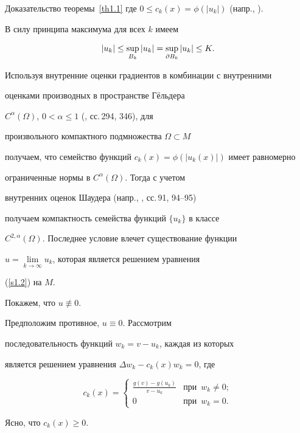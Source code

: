 \begin{pf*}{Доказательство теоремы~\ref{th1.1}}
где $0\leq c_k(x)=\phi(|u_k|)$ (напр., \cite{Lan2}).





В силу принципа максимума для всех $k$ имеем


$$


|u_k|\leq\sup_{B_k}|u_k|=\sup_{\d{B_k}}|u_k|\leq K.


$$


Используя внутренние оценки градиентов в комбинации с внутренними


оценками производных в пространстве Г\"ельдера


$C^\alpha(\Omega)$, $0<\alpha\leq1$ (\cite{Gi-T}, сс.\,294, 346), для


произвольного компактного подмножества $\Omega\subset M$ 


получаем, что семейство функций $c_k(x)=\phi(|u_k(x)|)$ имеет равномерно 


ограниченные нормы в $C^\alpha(\Omega)$. Тогда с учетом


внутренних оценок Шаудера (напр., \cite{Gi-T}, сс.\,91, 94--95)


получаем компактность семейства функций $\{u_k\}$ в классе 


$C^{2,\alpha}(\Omega)$. Последнее условие влечет существование функции 


$u=\lim\limits_{k\to\infty}u_k$, которая является решением уравнения


(\ref{s1.2}) на $M$.





Покажем, что $u\not\equiv 0$.


Предположим противное, $u\equiv 0$. Рассмотрим


последовательность функций $w_k=v-u_k$, каждая из которых


является решением уравнения $\Delta w_k-c_k(x)w_k=0$, где 


$$


c_k(x)=\begin{cases}


\frac{g(v)-g(u_k)}{v-u_k}& \text{при}\ \; w_k\ne0;\\


0& \text{при}\ \; w_k=0.


\end{cases}


$$


Ясно, что $c_k(x)\geq0$.






\end{pf*}
